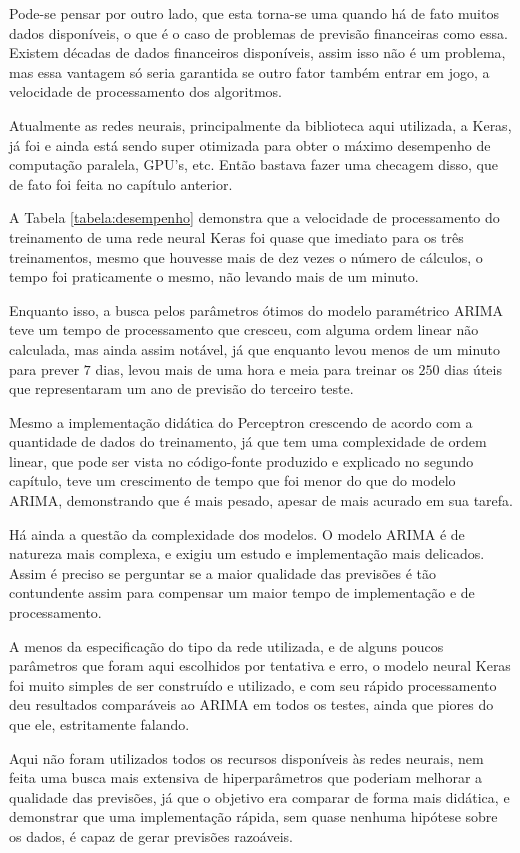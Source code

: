 Pode-se pensar por outro lado, que esta torna-se uma  quando há de fato muitos dados disponíveis, o que é o caso de problemas de previsão financeiras como essa. Existem décadas de dados financeiros disponíveis, assim isso não é um problema, mas essa vantagem só seria garantida se outro fator também entrar em jogo, a velocidade de processamento dos algoritmos.

Atualmente as redes neurais, principalmente da biblioteca aqui utilizada, a Keras, já foi e ainda está sendo super otimizada para obter o máximo desempenho de computação paralela, GPU's, etc. Então bastava fazer uma checagem disso, que de fato foi feita no capítulo anterior.

A Tabela \ref{tabela:desempenho} demonstra que a velocidade de processamento do treinamento de uma rede neural Keras foi quase que imediato para os três treinamentos, mesmo que houvesse mais de dez vezes o número de cálculos, o tempo foi praticamente o mesmo, não levando mais de um minuto.

Enquanto isso, a busca pelos parâmetros ótimos do modelo paramétrico ARIMA teve um tempo de processamento que cresceu, com alguma ordem linear não calculada, mas ainda assim notável, já que enquanto levou menos de um minuto para prever $7$ dias, levou mais de uma hora e meia para treinar os $250$ dias úteis que representaram um ano de previsão do terceiro teste.

Mesmo a implementação didática do Perceptron crescendo de acordo com a quantidade de dados do treinamento, já que tem uma complexidade de ordem linear, que pode ser vista no código-fonte produzido e explicado no segundo capítulo, teve um crescimento de tempo que foi menor do que do modelo ARIMA, demonstrando que é mais pesado, apesar de mais acurado em sua tarefa.

Há ainda a questão da complexidade dos modelos. O modelo ARIMA é de natureza mais complexa, e exigiu um estudo e implementação mais delicados. Assim é preciso se perguntar se a maior qualidade das previsões é tão contundente assim para compensar um maior tempo de implementação e de processamento.

A menos da especificação do tipo da rede utilizada, e de alguns poucos parâmetros que foram aqui escolhidos por tentativa e erro, o modelo neural Keras foi muito simples de ser construído e utilizado, e com seu rápido processamento deu resultados comparáveis ao ARIMA em todos os testes, ainda que piores do que ele, estritamente falando.

Aqui não foram utilizados todos os recursos disponíveis às redes neurais, nem feita uma busca mais extensiva de hiperparâmetros que poderiam melhorar a qualidade das previsões, já que o objetivo era comparar de forma mais didática, e demonstrar que uma implementação rápida, sem quase nenhuma hipótese sobre os dados, é capaz de gerar previsões razoáveis.

